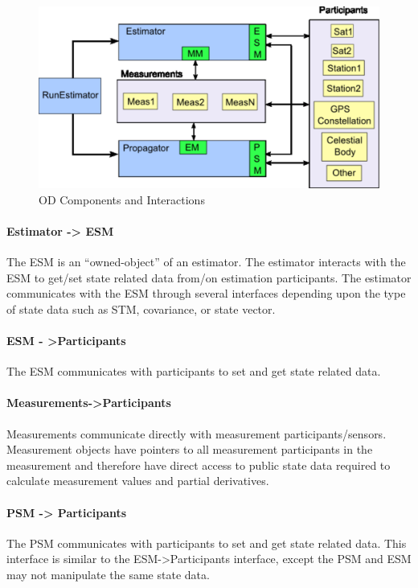 \begin{figure}[htbp]
\begin{center}
\includegraphics[scale=0.55]{Images/ODComponents.eps}
\caption{\label{fig:ODIneractions}OD Components and Interactions}
\end{center}
\end{figure}

\paragraph{Estimator -> ESM}  The ESM is an ``owned-object'' of an estimator.  The estimator
interacts with the ESM to get/set state related data from/on estimation participants.  The estimator
communicates with the ESM through several interfaces depending upon the type of state data such as
STM, covariance, or state vector.

\paragraph{ESM - >Participants}  The ESM communicates with participants to set and get state related
data.

\paragraph{Measurements->Participants}  Measurements communicate directly with measurement
participants/sensors.  Measurement objects have pointers to all measurement participants in the
measurement and therefore have direct access to public state data required to calculate measurement
values and partial derivatives.

\paragraph{PSM -> Participants}  The PSM communicates with participants to set and get state related
data.  This interface is similar to the ESM->Participants interface, except the PSM and ESM may not
manipulate the same state data.

